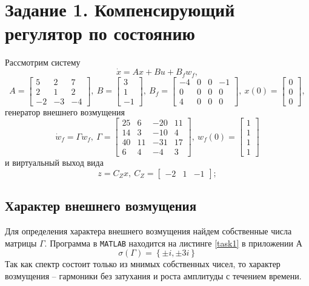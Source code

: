 \documentclass[a4paper, 12pt]{article}
\begin{document}
    \section{Задание 1. Компенсирующий регулятор по состоянию}
    Рассмотрим систему
    $$
    \dot{x}=Ax+Bu+B_f w_f,
    $$
    $$
    A=\begin{bmatrix}
        5 &2 &7\\
        2 &1 &2\\
        -2 &-3 &-4
    \end{bmatrix},\ B=\begin{bmatrix}
        3\\1\\-1
    \end{bmatrix},\ B_f=\begin{bmatrix}
        -4 &0 &0 &-1\\
        0 &0 &0 &0\\
        4 &0 &0 &0
    \end{bmatrix},\ x(0)=\begin{bmatrix}
        0\\0\\0
    \end{bmatrix},
    $$
    генератор внешнего возмущения
    $$
    \dot{ w}_f=\Gamma w_f,\ \Gamma=\begin{bmatrix}
        25 &6 &-20 &11\\
        14 &3 &-10 &4\\
        40 &11 &-31 &17\\
        6 &4 &-4 &3
    \end{bmatrix},\  w_f(0)=\begin{bmatrix}
        1\\1\\1\\1
    \end{bmatrix}
    $$
    и виртуальный выход вида
    $$
    z=C_Zx,\ C_Z=\begin{bmatrix}
        -2 &1 &-1
    \end{bmatrix};
    $$

    
    \subsection{Характер внешнего возмущения}
    Для определения характера внешнего возмущения найдем собственные числа матрицы $\Gamma$.
    Программа в \texttt{MATLAB} находится на листинге \ref{task1} в приложении А
    $$
    \sigma\left( \Gamma \right)=\left\{ \pm i, \pm 3i \right\}
    $$
    Так как спектр состоит только из мнимых собственных чисел, то характер возмущения -- гармоники
    без затухания и роста амплитуды с течением времени.
\end{document}

